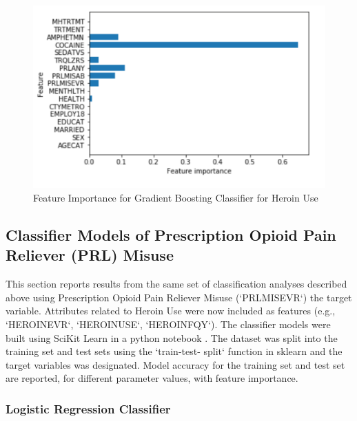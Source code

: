 \documentclass[sigconf]{acmart}
\begin{document}
\begin{figure}[!ht]
  \centering\includegraphics[width=\columnwidth]{images/Figure7.pdf}
  \caption{Feature Importance for Gradient Boosting Classifier for Heroin Use}
  \label{f:Figure7}
\end{figure}


\subsection{Classifier Models of Prescription Opioid Pain Reliever (PRL) Misuse}

This section reports results from the same set of classification analyses
described above using Prescription Opioid Pain Reliever Misuse (`PRLMISEVR`) 
the target variable. Attributes related to Heroin Use were now included as
features (e.g., `HEROINEVR`, `HEROINUSE`, `HEROINFQY`). The classifier models 
were built using SciKit Learn in a python notebook \cite{classifyPRL}. The
dataset was split into the training set and test sets using the `train-test-
split` function in sklearn and the target variables was designated. Model
accuracy for the training set and test set are reported, for different 
parameter values, with feature importance. 


\subsubsection{Logistic Regression Classifier}
\end{document}
